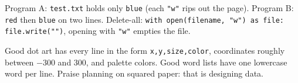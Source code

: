 \begin{answer}
Program A: \texttt{test.txt} holds only \texttt{blue} (each \texttt{"w"} rips out the page). Program B: \texttt{red} then \texttt{blue} on two lines.
Delete-all: \texttt{with open(filename, "w") as file: file.write("")}, opening with \texttt{"w"} empties the file.
\end{answer}

\begin{answer}[Creative]
Good dot art has every line in the form \texttt{x,y,size,color}, coordinates roughly between $-300$ and $300$, and palette colors.
Good word lists have one lowercase word per line. Praise planning on squared paper: that is designing data.
\end{answer}
